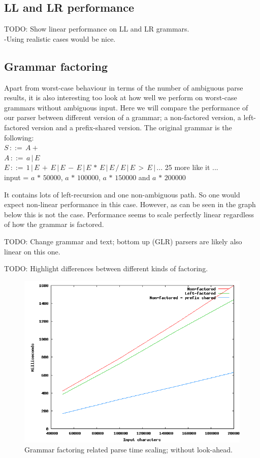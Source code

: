 \documentclass[a4paper,10pt]{article}
\begin{document}
\subsection{LL and LR performance}

TODO: Show linear performance on LL and LR grammars.\\
-Using realistic cases would be nice.

\subsection{Grammar factoring}

Apart from worst-case behaviour in terms of the number of ambiguous parse results, it is also interesting too look at how well we perform on worst-case grammars without ambiguous input. Here we will compare the performance of our parser between different version of a grammar; a non-factored version, a left-factored version and a prefix-shared version. The original grammar is the following:\\
$S\,::=\,A+$\\
$A\,::=\,a\,|\,E$\\
$E\,::=\,1\,|\,E\,+\,E\,|\,E\,-\,E\,|\,E\,*\,E\,|\,E\,/\,E\,|\,E\,>\,E\,|\,...$ 25 more like it ...\\
input = $a\,*\,50000$, $a\,*\,100000$, $a\,*\,150000$ and $a\,*\,200000$

It contains lots of left-recursion and one non-ambiguous path. So one would expect non-linear performance in this case. However, as can be seen in the graph below this is not the case. Performance seems to scale perfectly linear regardless of how the grammar is factored.

TODO: Change grammar and text; bottom up (GLR) parsers are likely also linear on this one.

TODO: Highlight differences between different kinds of factoring.

\begin{figure}[H]
\centering
\includegraphics[scale=0.5]{grammar-factoring.png}
\caption{Grammar factoring related parse time scaling; without look-ahead.}
\end{figure}
\end{document}
